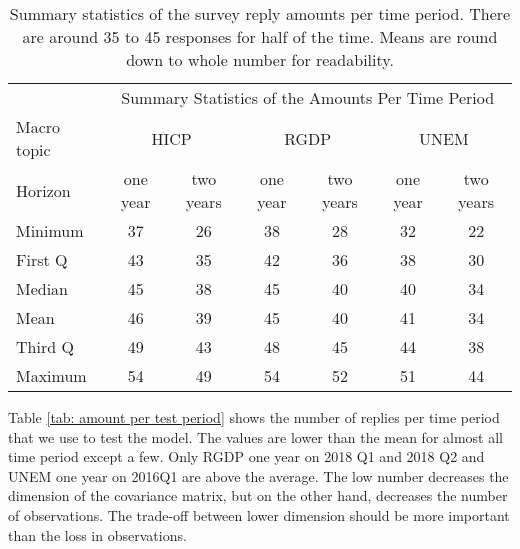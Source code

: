 \documentclass[11pt]{article}
\begin{document}
\begin{table}[!h]
	\centering
	\caption{Summary statistics of the survey reply amounts per time period. There are around 35 to 45 responses for half of the time. Means are round down to whole number for readability.}
	\label{tab: time summary statistics}
	\begin{tabular}{lcccccc}%
		\hline
		&\multicolumn{6}{c}{Summary Statistics of the Amounts Per Time Period}\\
		\cmidrule(lr){2-7}
		Macro topic & \multicolumn{2}{c}{HICP} & \multicolumn{2}{c}{RGDP} & \multicolumn{2}{c}{UNEM} \\
		\cmidrule(lr){2-3} \cmidrule(lr){4-5}\cmidrule(lr){6-7}
		Horizon     & one year & two years & one year & two years & one year & two years \\ 
		\hline
		Minimum & 37    & 26    & 38    & 28    & 32    & 22    \\
		First Q & 43    & 35    & 42    & 36    & 38    & 30    \\
		Median  & 45    & 38    & 45    & 40    & 40    & 34    \\
		Mean    & 46    & 39    & 45    & 40    & 41    & 34    \\
		Third Q & 49    & 43    & 48    & 45    & 44    & 38    \\
		Maximum & 54    & 49    & 54    & 52    & 51    & 44       \\ 
		\hline
	\end{tabular}
\end{table}

Table \ref{tab: amount per test period} shows the number of replies per time period that we use to test the model. The values are lower than the mean for almost all time period except a few. Only RGDP one year on 2018 Q1 and 2018 Q2 and UNEM one year on 2016Q1 are above the average. The low number decreases the dimension of the covariance matrix, but on the other hand, decreases the number of observations. The trade-off between lower dimension should be more important than the loss in observations.
\end{document}
